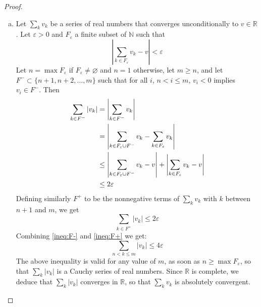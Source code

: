 \documentclass[11pt,a4paper,twoside]{article}
\theoremstyle{definition}
\begin{document}
\begin{proof}
\begin{enumerate}[(a)]
  \item Let $\sum_k v_k$ be a series of real numbers that converges unconditionally to $v \in \mathbb{R}$.
    Let $\varepsilon > 0$ and $F_\varepsilon$ a finite subset of $\mathbb{N}$ such that
    \begin{equation*}
      \left| \sum_{k \in F_\varepsilon} v_k - v \right| < \varepsilon
    \end{equation*}
    Let $n = \max F_\varepsilon$ if $F_\varepsilon \neq \varnothing$ and $n = 1$ otherwise, let $m \geq n$, and let $F^- \subset \{ n + 1, n + 2, \dotsc, m \}$
    such that for all $i$, $n < i \leq m$, $v_i < 0$ implies $v_i \in F^-$. Then
    \begin{align} \label{ineq:F-}
      \sum_{k \in F^-} | v_k | &= \left| \sum_{k \in F^-} v_k \right|  \notag \\
      &= \left| \sum_{k \in F_\varepsilon \cup F^-} v_k - \sum_{k \in F_\varepsilon} v_k \right| \notag \\
      &\leq \left| \sum_{k \in F_\varepsilon \cup F^-} v_k - v \right| + \left| \sum_{k \in F_\varepsilon} v_k - v \right| \notag \\
      &\leq 2 \varepsilon
    \end{align}
    Defining similarly $F^+$ to be the nonnegative terms of $\sum_k v_k$ with $k$ between $n + 1$ and $m$, we get
    \begin{equation} \label{ineq:F+}
      \sum_{k \in F^+} | v_k | \leq 2 \varepsilon
    \end{equation}
    Combining \eqref{ineq:F-} and \eqref{ineq:F+} we get:
    \begin{equation*}
      \sum_{n < k \leq m} | v_k | \leq 4 \varepsilon
    \end{equation*}
    The above inequality is valid for any value of $m$, as soon as $n \geq \max F_\varepsilon$, so that $\sum_k | v_k |$ is a Cauchy series of real numbers.
    Since $\mathbb{R}$ is complete, we deduce that $\sum_k | v_k |$ converges in $\mathbb{R}$, so that $\sum_k v_k$ is absolutely convergent.


\end{enumerate}
\end{proof}
\end{document}
